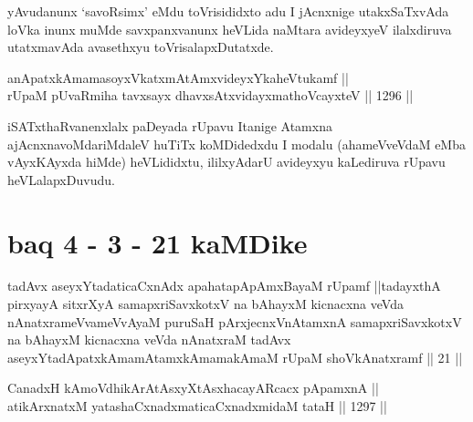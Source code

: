 \begin{artha}
yAvudanunx `savoR\s simx' eMdu toVrisididxto adu I jAcnxnige utakxSaTxvAda loVka inunx muMde savxpanxvanunx heVLida naMtara avideyxyeV ilalxdiruva utatxmavAda avasethxyu toVrisalapxDutatxde.
\end{artha}


\begin{shl}
\footnotemark[2]anApatxkAmamasoyxVkatxmAtAmxvideyxYkaheVtukamf || \\
rUpaM pUvaRmiha tavxsayx dhavxsAtxvidayxmathoVcayxteV \hfill || 1296 ||  
\end{shl}

\begin{artha}
iSATxthaRvanenxlalx paDeyada rUpavu Itanige Atamxna ajAcnxnavoMdariMdaleV huTiTx koMDidedxdu I modalu (ahameVveVdaM eMba vAyxKAyxda hiMde) heVLididxtu, ililxyAdarU avideyxyu kaLediruva rUpavu heVLalapxDuvudu.
\end{artha}


\section*{baq 4 - 3 - 21 kaMDike}

\begin{shl}
tadAvx aseyxYtadaticaCxnAdx apahatapApAmxBayaM rUpamf ||tadayxthA pirxyayA sitxrXyA samapxriSavxkotxV na bAhayxM kicnacxna veVda nAnatxrameVvameVvAyaM puruSaH pArxjecnxVnAtamxnA samapxriSavxkotxV na bAhayxM kicnacxna veVda nAnatxraM tadAvx aseyxYtadApatxkAmamAtamxkAmamakAmaM rUpaM shoVkAnatxramf || 21 ||
\end{shl}


\begin{shl}
\footnotemark[1]CanadxH kAmoV\s dhikArAtAsxyXtAsxhacayARcacx pApamxnA || \\
atikArxnatxM yatashaCxnadxmaticaCxnadxmidaM tataH || 1297 ||  
\end{shl}

